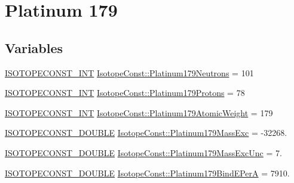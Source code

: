\hypertarget{group___isotope_const-_platinum-_pt179}{}\section{Platinum 179}
\label{group___isotope_const-_platinum-_pt179}
\subsection*{Variables}
\begin{DoxyCompactItemize}
\item 
\mbox{\hyperlink{group___isotope_const-_macros_ga5f18360b3e99483a35c32d789e62621c}{I\+S\+O\+T\+O\+P\+E\+C\+O\+N\+S\+T\+\_\+\+I\+NT}} \mbox{\hyperlink{group___isotope_const-_platinum-_pt179_ga32ab93a6e0e6fab077e907c48a8ad853}{Isotope\+Const\+::\+Platinum179\+Neutrons}} = 101
\item 
\mbox{\hyperlink{group___isotope_const-_macros_ga5f18360b3e99483a35c32d789e62621c}{I\+S\+O\+T\+O\+P\+E\+C\+O\+N\+S\+T\+\_\+\+I\+NT}} \mbox{\hyperlink{group___isotope_const-_platinum-_pt179_ga304e2e7d72b14433f8d87642cfbef8d9}{Isotope\+Const\+::\+Platinum179\+Protons}} = 78
\item 
\mbox{\hyperlink{group___isotope_const-_macros_ga5f18360b3e99483a35c32d789e62621c}{I\+S\+O\+T\+O\+P\+E\+C\+O\+N\+S\+T\+\_\+\+I\+NT}} \mbox{\hyperlink{group___isotope_const-_platinum-_pt179_gaf1faf2c58c6edc4e79d2dc15d4fde8b4}{Isotope\+Const\+::\+Platinum179\+Atomic\+Weight}} = 179
\item 
\mbox{\hyperlink{group___isotope_const-_macros_ga8f45a7272ce02c0b4c65c44636ed719a}{I\+S\+O\+T\+O\+P\+E\+C\+O\+N\+S\+T\+\_\+\+D\+O\+U\+B\+LE}} \mbox{\hyperlink{group___isotope_const-_platinum-_pt179_ga8328b830be411d72a7f9721fa7814ffa}{Isotope\+Const\+::\+Platinum179\+Mass\+Exc}} = -\/32268.
\item 
\mbox{\hyperlink{group___isotope_const-_macros_ga8f45a7272ce02c0b4c65c44636ed719a}{I\+S\+O\+T\+O\+P\+E\+C\+O\+N\+S\+T\+\_\+\+D\+O\+U\+B\+LE}} \mbox{\hyperlink{group___isotope_const-_platinum-_pt179_ga6c37fef50750f5f1d6f8f539da3bd9d8}{Isotope\+Const\+::\+Platinum179\+Mass\+Exc\+Unc}} = 7.
\item 
\mbox{\hyperlink{group___isotope_const-_macros_ga8f45a7272ce02c0b4c65c44636ed719a}{I\+S\+O\+T\+O\+P\+E\+C\+O\+N\+S\+T\+\_\+\+D\+O\+U\+B\+LE}} \mbox{\hyperlink{group___isotope_const-_platinum-_pt179_ga6cec8fe07155d9b53fbef85fb9a18a99}{Isotope\+Const\+::\+Platinum179\+Bind\+E\+PerA}} = 7910.
\item 

\end{DoxyCompactItemize}

